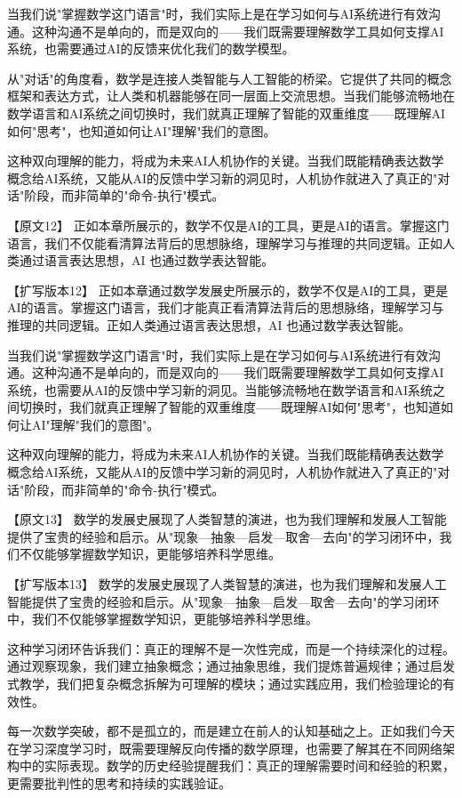 {当我们说"掌握数学这门语言"时，我们实际上是在学习如何与AI系统进行有效沟通。这种沟通不是单向的，而是双向的——我们既需要理解数学工具如何支撑AI系统，也需要通过AI的反馈来优化我们的数学模型。

从"对话"的角度看，数学是连接人类智能与人工智能的桥梁。它提供了共同的概念框架和表达方式，让人类和机器能够在同一层面上交流思想。当我们能够流畅地在数学语言和AI系统之间切换时，我们就真正理解了智能的双重维度——既理解AI如何"思考"，也知道如何让AI"理解"我们的意图。

这种双向理解的能力，将成为未来AI人机协作的关键。当我们既能精确表达数学概念给AI系统，又能从AI的反馈中学习新的洞见时，人机协作就进入了真正的"对话"阶段，而非简单的"命令-执行"模式。

【原文12】
正如本章所展示的，数学不仅是AI的工具，更是AI的语言。掌握这门语言，我们不仅能看清算法背后的思想脉络，理解学习与推理的共同逻辑。正如人类通过语言表达思想，AI 也通过数学表达智能。

【扩写版本12】
正如本章通过数学发展史所展示的，数学不仅是AI的工具，更是AI的语言。掌握这门语言，我们才能真正看清算法背后的思想脉络，理解学习与推理的共同逻辑。正如人类通过语言表达思想，AI 也通过数学表达智能。

当我们说"掌握数学这门语言"时，我们实际上是在学习如何与AI系统进行有效沟通。这种沟通不是单向的，而是双向的——我们既需要理解数学工具如何支撑AI系统，也需要从AI的反馈中学习新的洞见。当能够流畅地在数学语言和AI系统之间切换时，我们就真正理解了智能的双重维度——既理解AI如何"思考"，也知道如何让AI"理解"我们的意图"。

这种双向理解的能力，将成为未来AI人机协作的关键。当我们既能精确表达数学概念给AI系统，又能从AI的反馈中学习新的洞见时，人机协作就进入了真正的"对话"阶段，而非简单的"命令-执行"模式。

【原文13】
数学的发展史展现了人类智慧的演进，也为我们理解和发展人工智能提供了宝贵的经验和启示。从"现象—抽象—启发—取舍—去向"的学习闭环中，我们不仅能够掌握数学知识，更能够培养科学思维。

【扩写版本13】
数学的发展史展现了人类智慧的演进，也为我们理解和发展人工智能提供了宝贵的经验和启示。从"现象—抽象—启发—取舍—去向"的学习闭环中，我们不仅能够掌握数学知识，更能够培养科学思维。

这种学习闭环告诉我们：真正的理解不是一次性完成，而是一个持续深化的过程。通过观察现象，我们建立抽象概念；通过抽象思维，我们提炼普遍规律；通过启发式教学，我们把复杂概念拆解为可理解的模块；通过实践应用，我们检验理论的有效性。

每一次数学突破，都不是孤立的，而是建立在前人的认知基础之上。正如我们今天在学习深度学习时，既需要理解反向传播的数学原理，也需要了解其在不同网络架构中的实际表现。数学的历史经验提醒我们：真正的理解需要时间和经验的积累，更需要批判性的思考和持续的实践验证。

}
